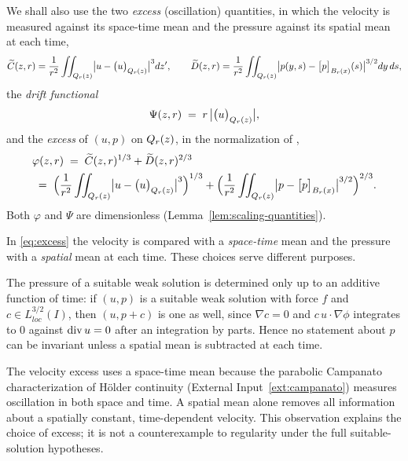 \documentclass[11pt,reqno]{amsart}
\begin{document}
We shall also use the two \emph{excess} (oscillation) quantities, in which the
velocity is measured against its space-time mean and the pressure against its
spatial mean at each time,
\begin{equation}\label{eq:excess-CD}
  \widetilde C(z,r)
    =\frac1{r^{2}}\iint_{Q_{r}(z)}\bigl|u-\bigl(u\bigr)_{Q_{r}(z)}\bigr|^{3}dz',
  \qquad
  \widetilde D(z,r)
    =\frac1{r^{2}}\iint_{Q_{r}(z)}
       \bigl|p(y,s)-\bigl[p\bigr]_{B_{r}(x)}(s)\bigr|^{3/2}dy\,ds ,
\end{equation}
the \emph{drift functional}
\begin{equation}\label{eq:drift}
  \Psi(z,r)\;=\;r\,\bigl|\bigl(u\bigr)_{Q_{r}(z)}\bigr| ,
\end{equation}
and the \emph{excess} of $(u,p)$ on $Q_{r}(z)$, in the normalization of
\cite[(6.14)]{Tsai2018},
\begin{equation}\label{eq:excess}\begin{aligned}
  &\varphi(z,r)
  \;=\;\widetilde C(z,r)^{1/3}+\widetilde D(z,r)^{2/3}
  \\ &\;=\;\Bigl(\frac1{r^{2}}\iint_{Q_{r}(z)}\bigl|u-\bigl(u\bigr)_{Q_{r}(z)}\bigr|^{3}\Bigr)^{1/3}
      +\Bigl(\frac1{r^{2}}\iint_{Q_{r}(z)}\bigl|p-\bigl[p\bigr]_{B_{r}(x)}\bigr|^{3/2}\Bigr)^{2/3}.
\end{aligned}\end{equation}
Both $\varphi$ and $\Psi$ are dimensionless
(Lemma~\ref{lem:scaling-quantities}).

\begin{remark}\label{rem:two-means}
In \eqref{eq:excess} the velocity is compared with a \emph{space-time} mean and
the pressure with a \emph{spatial} mean at each time. These choices serve
different purposes.

The pressure of a suitable weak solution is determined only up to an additive
function of time: if $(u,p)$ is a suitable weak solution with force $f$ and
$c\in L^{3/2}_{loc}(I)$, then $(u,p+c)$ is one as well, since $\nabla c=0$ and
$c\,u\cdot\nabla\phi$ integrates to $0$ against $\operatorname{div} u=0$ after an integration
by parts. Hence no statement about $p$ can be invariant unless a spatial mean is
subtracted at each time.

The velocity excess uses a space-time mean because the parabolic Campanato
characterization of H\"older continuity (External Input~\ref{ext:campanato})
measures oscillation in both space and time. A spatial mean alone removes
all information about a spatially constant, time-dependent velocity. This
observation explains the choice of excess; it is not a counterexample to
regularity under the full suitable-solution hypotheses.
\end{remark}
\end{document}
